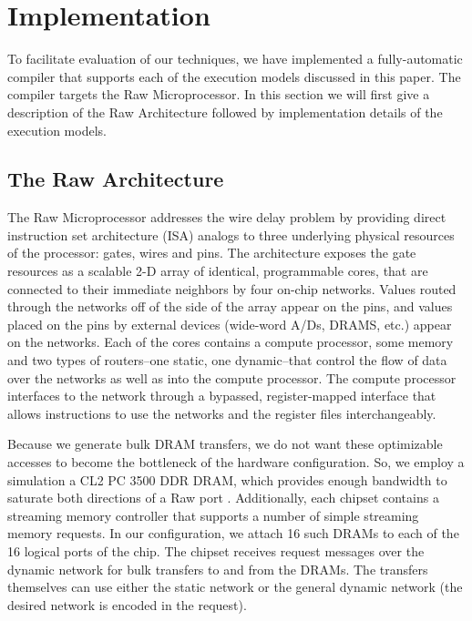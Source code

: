 \section{Implementation} 

To facilitate evaluation of our techniques, we have implemented a
fully-automatic compiler that supports each of the execution models
discussed in this paper.  The compiler targets the Raw
Microprocessor.  In this section we will first give a description of
the Raw Architecture followed by implementation details of the 
execution models.

\subsection{The Raw Architecture}
\label{sec:raw}

The Raw Microprocessor \cite{raw10,raw} addresses the wire delay
problem \cite{raw13} by providing direct instruction set architecture
(ISA) analogs to three underlying physical resources of the processor:
gates, wires and pins. The architecture exposes the gate resources as
a scalable 2-D array of identical, programmable cores, that are
connected to their immediate neighbors by four on-chip networks.
Values routed through the networks off of the side of the array appear
on the pins, and values placed on the pins by external devices
(wide-word A/Ds, DRAMS, etc.) appear on the networks.  Each of the
cores contains a compute processor, some memory and two types of
routers--one static, one dynamic--that control the flow of data over
the networks as well as into the compute processor.  The compute
processor interfaces to the network through a bypassed,
register-mapped interface \cite{raw10} that allows instructions to use
the networks and the register files interchangeably.

Because we generate bulk DRAM transfers, we do not want these
optimizable accesses to become the bottleneck of the hardware
configuration.  So, we employ a simulation a CL2 PC 3500 DDR DRAM,
which provides enough bandwidth to saturate both directions of a Raw
port \cite{raw_isca}.  Additionally, each chipset contains a streaming
memory controller that supports a number of simple streaming memory
requests. In our configuration, we attach 16 such DRAMs to each of the
16 logical ports of the chip.  The chipset receives request messages
over the dynamic network for bulk transfers to and from the DRAMs.
The transfers themselves can use either the static network or the
general dynamic network (the desired network is encoded in the
request).


